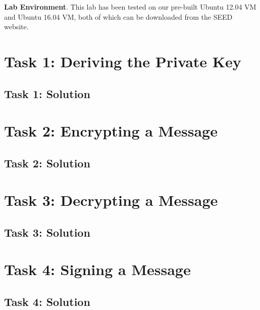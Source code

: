 \documentclass[12pt]{article}
\begin{document}
\textbf{Lab Environment}. This lab has been tested on our pre-built Ubuntu 12.04 VM and Ubuntu 16.04 VM, both of which
can be downloaded from the SEED website.

\clearpage
\section{Task 1: Deriving the Private Key}
\subsection{Task 1: Solution}


\clearpage
\section{Task 2: Encrypting a Message}
\subsection{Task 2: Solution}

\clearpage
\section{Task 3: Decrypting a Message}
\subsection{Task 3: Solution}

\clearpage
\section{Task 4: Signing a Message}
\subsection{Task 4: Solution}
\end{document}
